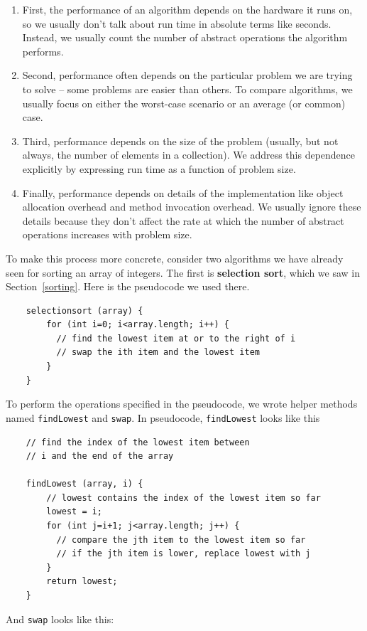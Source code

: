 \documentclass[12pt]{book}
\theoremstyle{exercise}
\begin{document}
\begin{enumerate}

\item First, the performance of an algorithm depends on the
hardware it runs on, so we usually don't talk about run time
in absolute terms like seconds.  Instead, we usually
count the number of abstract operations the algorithm performs.

\item Second, performance often depends on the particular
problem we are trying to solve -- some problems are easier than
others.  To compare algorithms, we usually focus on either the
worst-case scenario or an average (or common) case.

\item Third, performance depends on the size of the problem
(usually, but not always, the number of elements in a collection).
We address this dependence explicitly by
expressing run time as a function of problem size.

\item Finally, performance depends on
details of the implementation like object allocation overhead
and method invocation overhead.  We usually ignore these details
because they don't affect the rate at which the
number of abstract operations increases with problem size.

\end{enumerate}

To make this process more concrete, consider two algorithms we
have already seen for sorting an array of integers.  The
first is {\bf selection sort}, which we saw in Section~\ref{sorting}.
Here is the pseudocode we used there.

\begin{verbatim}
    selectionsort (array) {
        for (int i=0; i<array.length; i++) {
          // find the lowest item at or to the right of i
          // swap the ith item and the lowest item
        }
    }
\end{verbatim}
%
To perform the
operations specified in the pseudocode, we wrote helper methods named
{\tt findLowest} and {\tt swap}.  In pseudocode,
{\tt findLowest} looks like this

\begin{verbatim}
    // find the index of the lowest item between
    // i and the end of the array

    findLowest (array, i) {
        // lowest contains the index of the lowest item so far
        lowest = i;
        for (int j=i+1; j<array.length; j++) {
          // compare the jth item to the lowest item so far
          // if the jth item is lower, replace lowest with j
        }
        return lowest;
    }
\end{verbatim}
%
And {\tt swap} looks like this:
\end{document}
